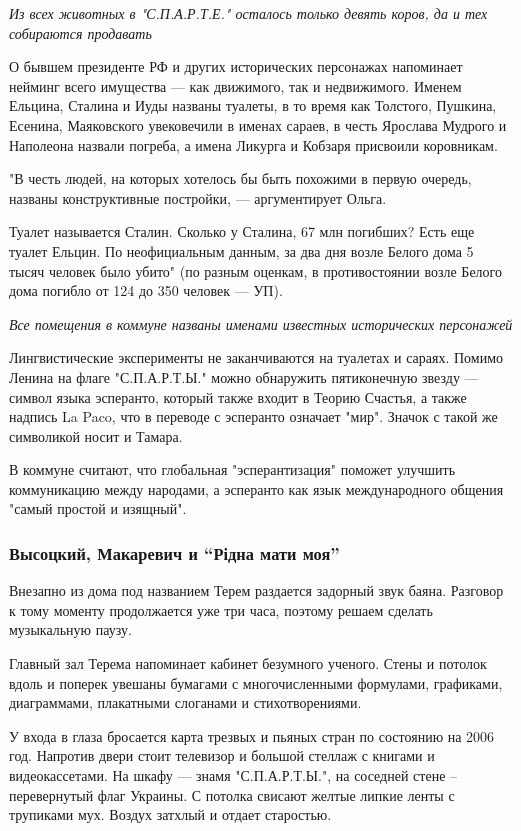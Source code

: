 {\em
Из всех животных в "С.П.А.Р.Т.Е." осталось только девять коров, да и тех собираются продавать
\/}

О бывшем президенте РФ и других исторических персонажах напоминает нейминг
всего имущества --- как движимого, так и недвижимого. Именем Ельцина, Сталина и
Иуды названы туалеты, в то время как Толстого, Пушкина, Есенина, Маяковского
увековечили в именах сараев, в честь Ярослава Мудрого и Наполеона назвали
погреба, а имена Ликурга и Кобзаря присвоили коровникам.

"В честь людей, на которых хотелось бы быть похожими в первую очередь, названы
конструктивные постройки, --- аргументирует Ольга.

Туалет называется Сталин. Сколько у Сталина, 67 млн погибших? Есть еще туалет
Ельцин. По неофициальным данным, за два дня возле Белого дома 5 тысяч человек
было убито" (по разным оценкам, в противостоянии возле Белого дома погибло от
124 до 350 человек --- УП).

\emph{Все помещения в коммуне названы именами известных исторических персонажей}

Лингвистические эксперименты не заканчиваются на туалетах и сараях. Помимо
Ленина на флаге "С.П.А.Р.Т.Ы." можно обнаружить пятиконечную звезду --- символ
языка эсперанто, который также входит в Теорию Счастья, а также надпись La
Paco, что в переводе с эсперанто означает "мир". Значок с такой же символикой
носит и Тамара.

В коммуне считают, что глобальная "эсперантизация" поможет улучшить
коммуникацию между народами, а эсперанто как язык международного общения "самый
простой и изящный".

\subsubsection{Высоцкий, Макаревич и ``Рідна мати моя''}

Внезапно из дома под названием Терем раздается задорный звук баяна. Разговор к
тому моменту продолжается уже три часа, поэтому решаем сделать музыкальную
паузу.

Главный зал Терема напоминает кабинет безумного ученого. Стены и потолок вдоль
и поперек увешаны бумагами с многочисленными формулами, графиками, диаграммами,
плакатными слоганами и стихотворениями. 

У входа в глаза бросается карта трезвых и пьяных стран по состоянию на 2006
год. Напротив двери стоит телевизор и большой стеллаж с книгами и
видеокассетами. На шкафу --- знамя "С.П.А.Р.Т.Ы.", на соседней стене –
перевернутый флаг Украины. С потолка свисают желтые липкие ленты с трупиками
мух. Воздух затхлый и отдает старостью.

